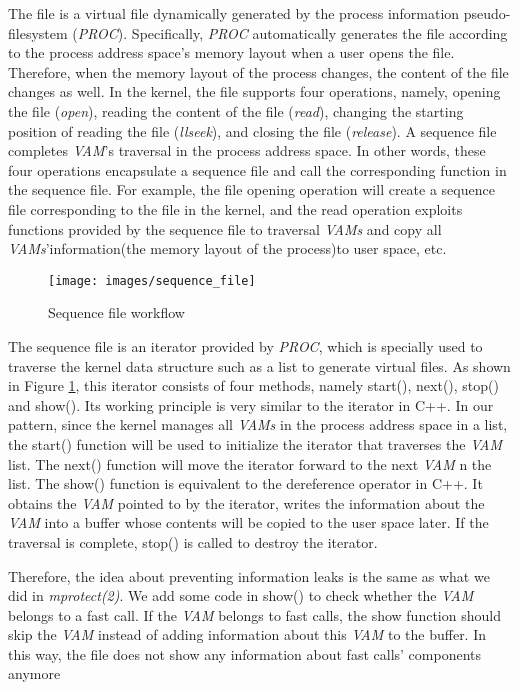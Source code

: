 The file is a virtual file dynamically generated by the process 
information pseudo-filesystem (\emph{PROC}). Specifically, \emph{PROC} automatically 
generates the file according to the process address space's memory 
layout when a user opens the file. Therefore, when the memory layout 
of the process changes, the content of the file changes as well. 
In the kernel, the file supports four operations, namely, opening 
the file (\emph{open}), reading the content of the file (\emph{read}), changing 
the starting position of reading the file (\emph{llseek}), and closing the 
file (\emph{release}). A sequence file completes \emph{VAM}'s traversal in the 
process address space. In other words, these four operations encapsulate 
a sequence file and call the corresponding function in the sequence file. 
For example, the file opening operation will create a sequence file 
corresponding to the file in the kernel, and the read operation exploits 
functions provided by the sequence file to traversal \emph{VAMs} and copy all 
\emph{VAMs}'information(the memory layout of the process)to user space, etc.
 
\begin{figure}[tbp]
  \centering
  \texttt{[image: images/sequence\_file]}
  \caption[Short description]{Sequence file workflow}
  \label{fig:sequence_file}
\end{figure}

The sequence file is an iterator provided by \emph{PROC}, which is 
specially used to traverse the kernel data structure such as a 
list to generate virtual files. As shown in Figure \ref{fig:sequence_file}, this 
iterator consists of four methods, namely start(), next(), 
stop() and show(). Its working principle is very similar to 
the iterator in C++. In our pattern, since the kernel manages 
all \emph{VAMs} in the process address space in a list, the start() 
function will be used to initialize the iterator that traverses 
the \emph{VAM} list. The next() function will move the iterator forward 
to the next \emph{VAM}  n the list. The show() function is equivalent to 
the dereference operator in C++. It obtains the \emph{VAM} pointed to by 
the iterator, writes the information about the \emph{VAM} into a buffer 
whose contents will be copied to the user space later. If the 
traversal is complete, stop() is called to destroy the iterator.

Therefore, the idea about preventing information leaks is the
 same as what we did in \emph{mprotect(2)}. We add some code in show() to 
 check whether the \emph{VAM} belongs to a fast call.  If the \emph{VAM} 
 belongs to fast calls, the show function should skip the \emph{VAM} 
 instead of adding information about this \emph{VAM} to the buffer. 
 In this way, the file does not show any information about 
 fast calls' components anymore



\cleardoublepage




